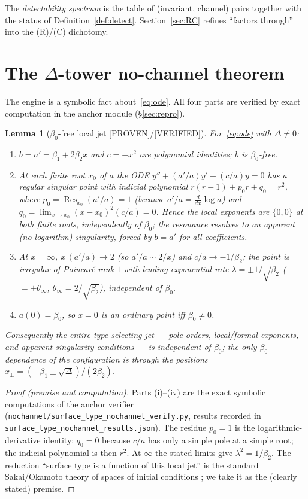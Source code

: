 \documentclass[11pt]{article}
\newtheorem{lemma}[theorem]{Lemma}
\theoremstyle{definition}
\newcommand{\Res}{\operatorname{Res}}
\newcommand{\PROVEN}{\textsf{[PROVEN]}}
\newcommand{\VERIFIED}{\textsf{[VERIFIED]}}
\begin{document}
The \emph{detectability spectrum} is the table of (invariant, channel) pairs together
with the status of Definition~\ref{def:detect}. Section~\ref{sec:RC} refines
``factors through'' into the (R)/(C) dichotomy.

\section{The $\Delta$-tower no-channel theorem}\label{sec:main}

The engine is a symbolic fact about~\eqref{eq:ode}. All four parts are verified by
exact computation in the anchor module (\S\ref{sec:repro}).

\begin{lemma}[$\beta_0$-free local jet \PROVEN/\VERIFIED]\label{lem:jet}
For~\eqref{eq:ode} with $\Delta\neq0$:
\begin{enumerate}[label=(\roman*),leftmargin=2.2em]
\item $b=a'=\beta_1+2\beta_2x$ and $c=-x^2$ are polynomial identities; $b$ is
$\beta_0$-free.
\item At each finite root $x_0$ of $a$ the ODE $y''+(a'/a)y'+(c/a)y=0$ has a regular
singular point with indicial polynomial $r(r-1)+p_0r+q_0=r^2$, where
$p_0=\Res_{x_0}(a'/a)=1$ (because $a'/a=\frac{d}{dx}\log a$) and
$q_0=\lim_{x\to x_0}(x-x_0)^2(c/a)=0$. Hence the local exponents are $\{0,0\}$ at both
finite roots, independently of $\beta_0$; the resonance resolves to an
\emph{apparent} (no-logarithm) singularity, forced by $b=a'$ for all coefficients.
\item At $x=\infty$, $x\,(a'/a)\to2$ (so $a'/a\sim2/x$) and $c/a\to-1/\beta_2$; the
point is irregular of Poincar\'e rank $1$ with leading exponential rate
$\lambda=\pm1/\sqrt{\beta_2}$ ($=\pm\theta_\infty$, $\theta_\infty=2/\sqrt{\beta_2}$),
independent of $\beta_0$.
\item $a(0)=\beta_0$, so $x=0$ is an ordinary point iff $\beta_0\neq0$.
\end{enumerate}
Consequently the entire type-selecting jet --- pole orders, local/formal exponents,
and apparent-singularity conditions --- is independent of $\beta_0$; the only
$\beta_0$-dependence of the configuration is through the positions
$x_\pm=(-\beta_1\pm\sqrt\Delta)/(2\beta_2)$.
\end{lemma}

\begin{proof}[Proof (premise and computation)]
Parts (i)--(iv) are the exact symbolic computations of the anchor verifier
(\texttt{nochannel/surface\_type\_nochannel\_verify.py}, results recorded in
\texttt{surface\_type\_nochannel\_results.json}). The residue $p_0=1$ is the
logarithmic-derivative identity; $q_0=0$ because $c/a$ has only a simple pole at a
simple root; the indicial polynomial is then $r^2$. At $\infty$ the stated limits give
$\lambda^2=1/\beta_2$. The reduction ``surface type is a function of this local jet''
is the standard Sakai/Okamoto theory of spaces of initial conditions
\cite{Sakai2001}; we take it as the (clearly stated) premise.
\end{proof}
\end{document}
